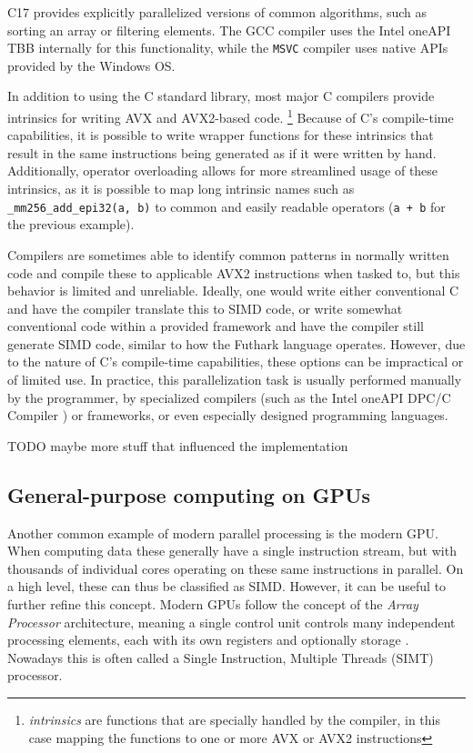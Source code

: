 \documentclass[12pt,dvipsnames]{article}
\newcommand{\helpme}[1]{{\color{red}#1}}
\newcommand{\icpp}[1]{\texttt{#1}}
\newcommand{\mono}[1]{\texttt{#1}}
\newcommand{\Rplus}{\protect\hspace{-.1em}\protect\raisebox{.35ex}{\smaller{\smaller\textbf{+}}}}
\newcommand{\Cpp}{\mbox{C\Rplus\Rplus}\xspace}
\newcommand{\CppXVII}{\mbox{C\Rplus\Rplus17}\xspace}
\begin{document}
\CppXVII provides explicitly parallelized versions of common algorithms, such as sorting an array or filtering elements. The GCC compiler uses the Intel oneAPI TBB \cite{oneapi} internally for this functionality, while the \mono{MSVC} compiler uses native APIs provided by the Windows OS.

In addition to using the \Cpp standard library, most major \Cpp compilers provide intrinsics for writing AVX and AVX2-based code. \footnote{\textit{intrinsics} are functions that are specially handled by the compiler, in this case mapping the functions to one or more AVX or AVX2 instructions} Because of \Cpp's compile-time capabilities, it is possible to write wrapper functions for these intrinsics that result in the same instructions being generated as if it were written by hand. Additionally, operator overloading allows for more streamlined usage of these intrinsics, as it is possible to map long intrinsic names such as \icpp{_mm256_add_epi32(a, b)} to common and easily readable operators (\icpp{a + b} for the previous example).

Compilers are sometimes able to identify common patterns in normally written code and compile these to applicable AVX2 instructions when tasked to, but this behavior is limited and unreliable. Ideally, one would write either conventional \Cpp and have the compiler translate this to SIMD code, or write somewhat conventional code within a provided framework and have the compiler still generate SIMD code, similar to how the Futhark language operates. However, due to the nature of \Cpp's compile-time capabilities, these options can be impractical or of limited use. In practice, this parallelization task is usually performed manually by the programmer, by specialized compilers (such as the Intel oneAPI DP\Cpp/\Cpp Compiler \cite{intelcompiler}) or frameworks, or even especially designed programming languages.

\helpme{TODO maybe more stuff that influenced the implementation}

\subsection{General-purpose computing on GPUs}
Another common example of modern parallel processing is the modern GPU. When computing data these generally have a single instruction stream, but with thousands of individual cores operating on these same instructions in parallel. On a high level, these can thus be classified as SIMD. However, it can be useful to further refine this concept. Modern GPUs follow the concept of the \textit{Array Processor} architecture, meaning a single control unit controls many independent processing elements, each with its own registers and optionally storage \cite{flynn2}. Nowadays this is often called a Single Instruction, Multiple Threads (SIMT) processor.
\end{document}
